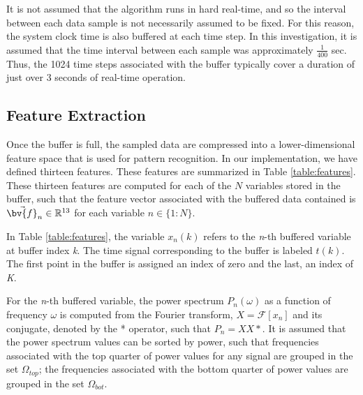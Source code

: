It is not assumed that the algorithm runs in hard real-time, and so
the interval between each data sample is not necessarily assumed to be
fixed. For this reason, the system clock time is also buffered at
each time step. In this investigation, it is assumed that the time
interval between each sample was approximately $\frac{1}{400}$
sec. Thus, the 1024 time steps associated with the buffer typically
cover a duration of just over 3 seconds of real-time operation.

\subsection{Feature Extraction}
Once the buffer is full, the sampled data are compressed into a
lower-dimensional feature space that is used for pattern
recognition. In our implementation, we have defined thirteen
features. These features are summarized in Table
\ref{table:features}. These thirteen features are computed for each of
the $N$ variables stored in the buffer, such that the feature vector
associated with the buffered data contained is $\vec{\bv{f}}_n \in
\mathbb{R}^{13}$ for each variable $n \in \{1:N\}$. 

In Table \ref{table:features}, the variable $x_n(k)$ refers to the \textit{n}-th
buffered variable at buffer index \textit{k}. The time signal
corresponding to the buffer is labeled $t(k)$. The first point in the
buffer is assigned an index of zero and the last, an index of
\textit{K}. 

For the \textit{n}-th buffered variable, the power spectrum
$P_n(\omega)$ as a function of frequency $\omega$ is computed from the
Fourier transform, $X=\mathcal{F}[x_n]$ and its conjugate, denoted by
the * operator, such that $P_n = XX*$. It is assumed that the power
spectrum values can be sorted by power, such that frequencies
associated with the top quarter of power values for any signal are
grouped in the set $\Omega_{top}$; the frequencies associated with the
bottom quarter of power values are grouped in the set $\Omega_{bot}$.

